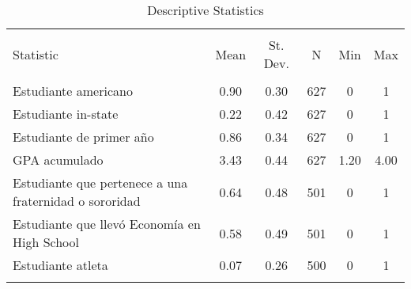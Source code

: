 
\begin{table}[!htbp] \centering 
  \caption{Descriptive Statistics} 
  \label{} 
\begin{tabular}{@{\extracolsep{5pt}}lccccc} 
\\[-1.8ex]\hline 
\hline \\[-1.8ex] 
Statistic & \multicolumn{1}{c}{Mean} & \multicolumn{1}{c}{St. Dev.} & \multicolumn{1}{c}{N} & \multicolumn{1}{c}{Min} & \multicolumn{1}{c}{Max} \\ 
\hline \\[-1.8ex] 
Estudiante americano & 0.90 & 0.30 & 627 & 0 & 1 \\ 
Estudiante in-state & 0.22 & 0.42 & 627 & 0 & 1 \\ 
Estudiante de primer año & 0.86 & 0.34 & 627 & 0 & 1 \\ 
GPA acumulado & 3.43 & 0.44 & 627 & 1.20 & 4.00 \\ 
Estudiante que pertenece a una fraternidad o sororidad & 0.64 & 0.48 & 501 & 0 & 1 \\ 
Estudiante que llevó Economía en High School & 0.58 & 0.49 & 501 & 0 & 1 \\ 
Estudiante atleta & 0.07 & 0.26 & 500 & 0 & 1 \\ 
\hline \\[-1.8ex] 
\end{tabular} 
\end{table} 
